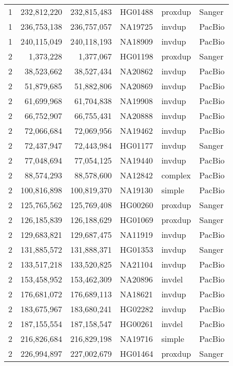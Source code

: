 {\begin{tiny}
\begin{longtable}{rrrlll}
    1   & 232,812,220 & 232,815,483 & HG01488 & proxdup & Sanger  \\
    1   & 236,753,138 & 236,757,057 & NA19725 & invdup  & PacBio  \\
    1   & 240,115,049 & 240,118,193 & NA18909 & invdup  & PacBio  \\
    2   & 1,373,228   & 1,377,067   & HG01198 & proxdup & Sanger  \\
    2   & 38,523,662  & 38,527,434  & NA20862 & invdup  & PacBio  \\
    2   & 51,879,685  & 51,882,806  & NA20869 & invdup  & PacBio  \\
    2   & 61,699,968  & 61,704,838  & NA19908 & invdup  & PacBio  \\
    2   & 66,752,907  & 66,755,431  & NA20888 & invdup  & PacBio  \\
    2   & 72,066,684  & 72,069,956  & NA19462 & invdup  & PacBio  \\
    2   & 72,437,947  & 72,443,984  & HG01177 & invdup  & Sanger  \\
    2   & 77,048,694  & 77,054,125  & NA19440 & invdup  & PacBio  \\
    2   & 88,574,293  & 88,578,600  & NA12842 & complex & PacBio  \\
    2   & 100,816,898 & 100,819,370 & NA19130 & simple  & PacBio  \\
    2   & 125,765,562 & 125,769,408 & HG00260 & proxdup & Sanger  \\
    2   & 126,185,839 & 126,188,629 & HG01069 & proxdup & Sanger  \\
    2   & 129,683,821 & 129,687,475 & NA11919 & invdup  & PacBio  \\
    2   & 131,885,572 & 131,888,371 & HG01353 & invdup  & Sanger  \\
    2   & 133,517,218 & 133,520,825 & NA21104 & invdup  & PacBio  \\
    2   & 153,458,952 & 153,462,309 & NA20896 & invdel  & PacBio  \\
    2   & 176,681,072 & 176,689,113 & NA18621 & invdup  & PacBio  \\
    2   & 183,675,967 & 183,680,241 & HG02282 & invdup  & PacBio  \\
    2   & 187,155,554 & 187,158,547 & HG00261 & invdel  & PacBio  \\
    2   & 216,826,684 & 216,829,198 & NA19716 & simple  & PacBio  \\
    2   & 226,994,897 & 227,002,679 & HG01464 & proxdup & Sanger  \\

\end{longtable}
\end{tiny}}
